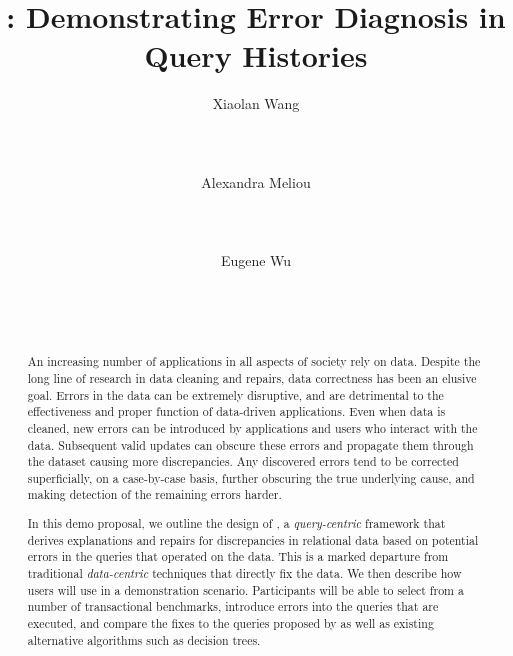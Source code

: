 \title{{\sys}: Demonstrating Error Diagnosis in Query Histories}

\author{
  \alignauthor Xiaolan Wang\\
    \\
    \\
    \\
  \alignauthor Alexandra Meliou\\
  \\
    \\
    \\
  \alignauthor Eugene Wu\\
    \\
    \\
    \\
}




{
\maketitle
\vspace*{-.5in}
}

\begin{abstract}
An increasing number of applications in all aspects of society rely on
data. Despite the long line of research in data cleaning and repairs,
data correctness has been an elusive goal. Errors in the data can be
extremely disruptive, and are detrimental to the effectiveness and
proper function of data-driven applications. Even when data is
cleaned, new errors can be introduced by applications and users who
interact with the data. Subsequent valid updates can obscure these
errors and propagate them through the dataset causing more
discrepancies. Any discovered errors tend to be corrected
superficially, on a case-by-case basis, further obscuring the true
underlying cause, and making detection of the remaining errors harder.

In this demo proposal, we outline the design of \sys, a {\it query-centric}
framework that derives explanations and repairs for discrepancies in 
relational data based on potential errors in the queries that operated on the data. 
This is a marked departure from traditional {\it data-centric} techniques that directly fix the data.
We then describe how users will use \sys in a demonstration scenario. 
Participants will be able to select from a number of 
transactional benchmarks, introduce errors into the queries that are executed,
and compare the fixes to the queries proposed by \sys as well as existing alternative algorithms
such as decision trees.

\end{abstract}

